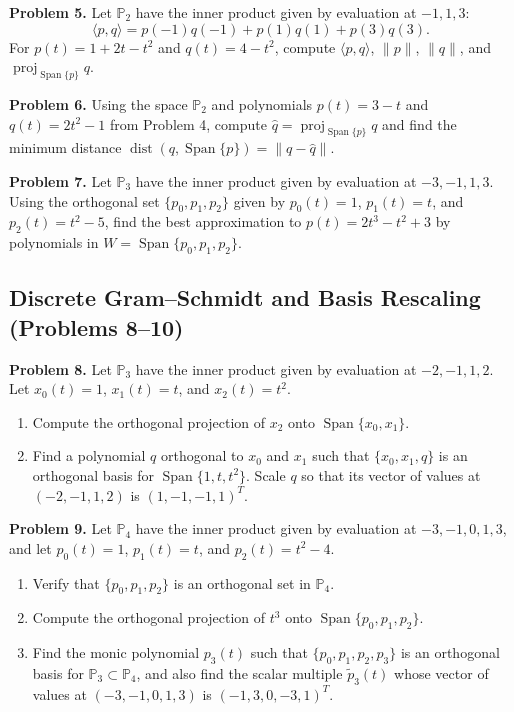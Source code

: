 \documentclass[11pt, letterpaper]{article}
\theoremstyle{definition}
\theoremstyle{remark}
\begin{document}
\textbf{Problem 5.} Let $\mathbb{P}_2$ have the inner product given by evaluation at $-1, 1, 3$:
\[
\langle p, q \rangle = p(-1)q(-1) + p(1)q(1) + p(3)q(3).
\]
For $p(t) = 1 + 2t - t^2$ and $q(t) = 4 - t^2$, compute $\langle p, q \rangle$, $\|p\|$, $\|q\|$, and $\operatorname{proj}_{\operatorname{Span}\{p\}} q$.

\textbf{Problem 6.} Using the space $\mathbb{P}_2$ and polynomials $p(t) = 3 - t$ and $q(t) = 2t^2 - 1$ from Problem 4, compute $\hat{q} = \operatorname{proj}_{\operatorname{Span}\{p\}} q$ and find the minimum distance $\operatorname{dist}(q, \operatorname{Span}\{p\}) = \|q - \hat{q}\|$.

\textbf{Problem 7.} Let $\mathbb{P}_3$ have the inner product given by evaluation at $-3, -1, 1, 3$. Using the orthogonal set $\{p_0, p_1, p_2\}$ given by $p_0(t) = 1$, $p_1(t) = t$, and $p_2(t) = t^2 - 5$, find the best approximation to $p(t) = 2t^3 - t^2 + 3$ by polynomials in $W = \operatorname{Span}\{p_0, p_1, p_2\}$.

\subsection{Discrete Gram--Schmidt and Basis Rescaling (Problems 8--10)}

\textbf{Problem 8.} Let $\mathbb{P}_3$ have the inner product given by evaluation at $-2, -1, 1, 2$. Let $x_0(t) = 1$, $x_1(t) = t$, and $x_2(t) = t^2$.
\begin{enumerate}[label=(\alph*)]
    \item Compute the orthogonal projection of $x_2$ onto $\operatorname{Span}\{x_0, x_1\}$.
    \item Find a polynomial $q$ orthogonal to $x_0$ and $x_1$ such that $\{x_0, x_1, q\}$ is an orthogonal basis for $\operatorname{Span}\{1, t, t^2\}$. Scale $q$ so that its vector of values at $(-2, -1, 1, 2)$ is $(1, -1, -1, 1)^T$.
\end{enumerate}

\textbf{Problem 9.} Let $\mathbb{P}_4$ have the inner product given by evaluation at $-3, -1, 0, 1, 3$, and let $p_0(t) = 1$, $p_1(t) = t$, and $p_2(t) = t^2 - 4$.
\begin{enumerate}[label=(\alph*)]
    \item Verify that $\{p_0, p_1, p_2\}$ is an orthogonal set in $\mathbb{P}_4$.
    \item Compute the orthogonal projection of $t^3$ onto $\operatorname{Span}\{p_0, p_1, p_2\}$.
    \item Find the monic polynomial $p_3(t)$ such that $\{p_0, p_1, p_2, p_3\}$ is an orthogonal basis for $\mathbb{P}_3 \subset \mathbb{P}_4$, and also find the scalar multiple $\tilde{p}_3(t)$ whose vector of values at $(-3, -1, 0, 1, 3)$ is $(-1, 3, 0, -3, 1)^T$.
\end{enumerate}
\end{document}
